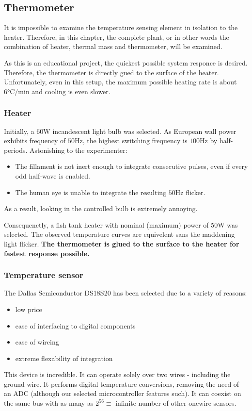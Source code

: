 \subsection{Thermometer}
It is impossible to examine the temperature sensing element in isolation to the heater.
Therefore, in this chapter, the complete plant, or in other words the combination of heater, thermal mass and thermometer, will be examined.
\par
As this is an educational project, the quickest possible system responce is desired.
Therefore, the thermometer is directly gued to the surface of the heater.
Unfortunately, even in this setup, the maximum possible heating rate is about $6\si{\celsius}/\si{\minute}$ and cooling is even slower.

\subsubsection{Heater}
Initially, a $60\si{\watt}$ incandescent light bulb was selected.
As European wall power exhibits frequency of $50\si{\hertz}$, the highest switching frequency is $100\si{\hertz}$ by half-periods.
Astonishing to the experimenter:
\begin{itemize}
\item{The fillament is not inert enough to integrate consecutive pulses, even if every odd half-wave is enabled.}
\item{The human eye is unable to integrate the resulting $50\si{\hertz}$ flicker.}
\end{itemize}
As a result, looking in the controlled bulb is extremely annoying.
\par
Consequenctly, a fish tank heater with nominal (maximum) power of $50\si{\watt}$ was selected.
The observed temperature curves are equivelent sans the maddening light flicker.
\textbf{The thermometer is glued to the surface to the heater for fastest response possible.}

\subsubsection{Temperature sensor}
The Dallas Semiconductor DS18S20 has been selected due to a variety of reasons:
\begin{itemize}
\item{low price}
\item{ease of interfacing to digital components}
\item{ease of wireing}
\item{extreme flexability of integration}
\end{itemize}
This device is incredible.
It can operate solely over two wires - including the ground wire.
It performs digital temperature conversions, removing the need of an ADC (although our selected microcontroller features such).
It can coexist on the same bus with as many as $2^{56}\equiv$ infinite number of other onewire sensors.

